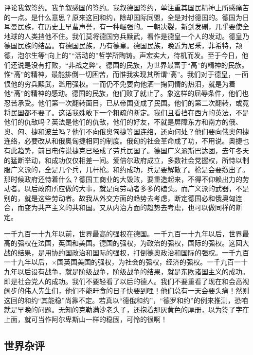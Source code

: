 评论我叙签约。我争叙感国的签约。我叙德国签约，单注重其国民精神上所感痛苦的一点。是什么意思？原来这回和约，除却国际同盟，全是对付德国的。德国为日耳曼民族，在历史上早蜚声誉，有一种崛强的。一朝决裂，新剑发硎，几乎要使全地球的人类挡他不住。我们莫将德国穷兵黩武，看作是德皇一个人的发动。德皇乃德国民族的结晶。有德国民族，乃有德皇。德国民族，晚近为尼釆，菲希特，颉德，泡尔生等“向上的”“活动的”哲学所陶铸。声宏实大，待机而发。至于今日，他们还说是没有打败，“非战之弊”。德国的民族，为世界最富于“高”的精神的民族。惟“高”的精神，最能排倒一切困苦，而惟我实现其所谓“高”。我们对于德皇，一面恨他的穷兵黩武，滥用强权。一而仍不免要向他洒一掬同情的热泪，就是为着他“高”的精神的感动。德国的民族，他们败了就止了。象这样的屈辱条件，他们也忍苦承受。他们第一次翻转面目，已从帝国变成了民国。他们的第二次翻转，或竟将民国都不要了。这话我殊敢下一个粗疏的断定。我们且看挡在西方的英法，不是他们的仇敌吗？英法是他们的仇敌，他们的好友，不就是屏障东方和南方的俄、奥、匈、捷和波兰吗？他们不向俄奥匈捷等国连络，还向何处？他们要向俄奥匈捷连络，必要改从和俄奥匈捷相同的制度。俄匈的社会革命成了功，不用说。奥捷也有此趋势，前日电传说捷克已经成了劳兵民国了。德国广义派斯巴达团，去年冬天的猛断举动，和成功仅仅相差一间。爱倍尔政府成立，多数社会党握权，所恃以制服广义派的，全是几个兵，几杆枪。和约成功，兵是要解散了。枪是会要缴出了。那时候政府还恃着什么？德国工商业的大毁败，要重造起来，不得不仰赖出力的劳动者。以后政府所应做的大事，就是向劳动者多多的磕头。而广义派的武器，不是别的，就是这些劳动者。故我从外交方面的趋势去考虑，断定德国必和俄奥匈连合，而变为共产主义的共和国。又从内治方面的趋势去考虑，也可以做同样的断定。

一千九百一十九年以前，世界最高的强权在德国。一千九百一十九年以后，世界最高的强权在法国，英国和美国。德国的强权，为政治的强权，国际的强权。这回大战的结果，是用协约国政治和国际的强权，打倒德奥政治和国际的强权。一千九百一十九年以后，×国英国美国的强权，为社会的强权，经济的强权。一千九百一十九年以后设有战争，就是阶级战争，阶级战争的结果，就是东欧诸国主义的成功。即是社会党人的成功。我们不要轻看了以后的德人。我们不要重看了现在和会高视阔步的伟人先生们，他们不能旰食的日子快要到哩！他们总有一天会要头痛！然则这回的和约“其能稳”尚靠不定。若真以“德俄和约”，“德罗和约”的例来推测，恐咱就是早晚的问题。无知的克勒满沙老头子，还抱着那灰黄色的厚册，以为签了字在上面，就可当作阿尔卑斯山一样的稳固，可怜的很啊！

\subsection{世界杂评}


